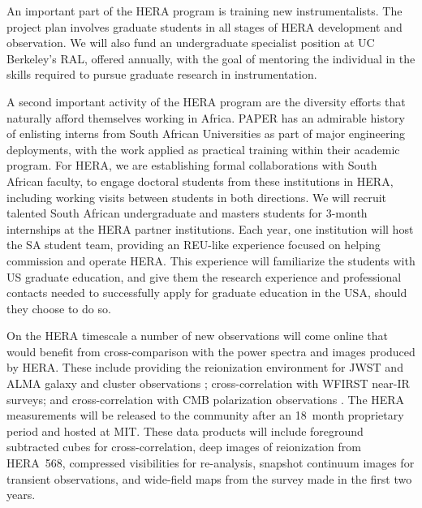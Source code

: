 \documentclass[preprint]{aastex}
\begin{document}
An important part of the HERA program is training new
instrumentalists.  The project plan involves graduate students in all
stages of HERA development and observation. We will also fund an
undergraduate specialist position
at UC Berkeley's RAL, offered annually, with the goal of
mentoring the individual in the skills required to pursue graduate
research in instrumentation.

A second important activity of the HERA program are the diversity
efforts that naturally afford themselves working in Africa. PAPER has
an admirable history of enlisting interns from South African
Universities as part of major engineering deployments, with the work
applied as practical training within their academic program.
For HERA, we are establishing formal collaborations with South African
faculty, to engage doctoral students from these institutions in HERA,
including working visits between students in both directions. We will
recruit talented South African undergraduate and masters students for
3-month internships at the HERA partner institutions. Each year, one
institution will host the SA student team, providing an REU-like
experience focused on helping commission and operate HERA. This
experience will familiarize the students with US graduate education,
and give them the research experience and professional contacts needed
to successfully apply for graduate education in the USA, should they
choose to do so.

%
%

\vspace{5 pt}
On the HERA timescale a number of new observations will come online that would
benefit from cross-comparison with the power spectra and images produced by
HERA. These include providing the reionization environment for JWST and ALMA
galaxy and cluster observations \citep{gong_et_al2011}; cross-correlation with WFIRST near-IR surveys;
and cross-correlation with CMB polarization observations \citep{tashiro_et_al2010}. The HERA measurements
will be released to the community after an 18~month proprietary period and
hosted at MIT. These data products will include foreground subtracted cubes for
cross-correlation, deep images of reionization from HERA~568, compressed
visibilities for re-analysis, snapshot continuum images for transient
observations, and wide-field maps from the survey made in the first two years.
\end{document}
